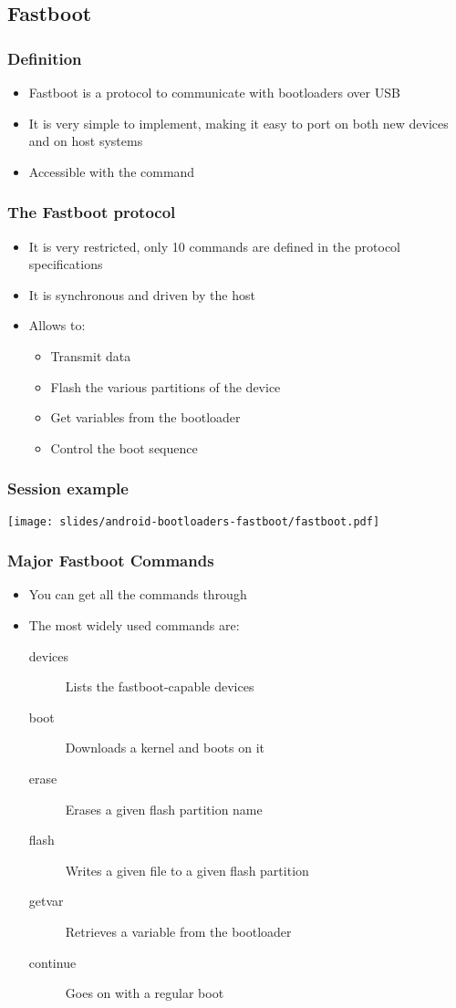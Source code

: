 \subsection{Fastboot}
\begin{frame}
  \frametitle{Definition}
  \begin{itemize}
  \item Fastboot is a protocol to communicate with bootloaders over
    USB
  \item It is very simple to implement, making it easy to port on
    both new devices and on host systems
  \item Accessible with the  command
  \end{itemize}
\end{frame}

\begin{frame}
  \frametitle{The Fastboot protocol}
  \begin{itemize}
  \item It is very restricted, only 10 commands are defined in the
    protocol specifications
  \item It is synchronous and driven by the host
  \item Allows to:
    \begin{itemize}
      \item Transmit data
      \item Flash the various partitions of the device
      \item Get variables from the bootloader
      \item Control the boot sequence
    \end{itemize}
  \end{itemize}
\end{frame}

\begin{frame}
  \frametitle{Session example}
  \begin{center}
    \texttt{[image: slides/android-bootloaders-fastboot/fastboot.pdf]}
  \end{center}
\end{frame}

\begin{frame}
  \frametitle{Major Fastboot Commands}
  \begin{itemize}
  \item You can get all the commands through 
  \item The most widely used commands are:
    \begin{description}
    \item[devices] Lists the fastboot-capable devices
    \item[boot] Downloads a kernel and boots on it
    \item[erase] Erases a given flash partition name
    \item[flash] Writes a given file to a given flash partition
    \item[getvar] Retrieves a variable from the bootloader
    \item[continue] Goes on with a regular boot
    \end{description}
  \end{itemize}
\end{frame}
